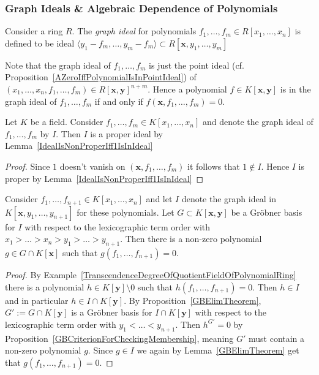 \subsubsection{Graph Ideals \& Algebraic Dependence of Polynomials} 
\begin{definition}
    Consider a ring $R$. The \textit{graph ideal} for polynomials $f_1,\dots,f_m\in R[x_1,\dots,x_n]$ is defined to be ideal $\langle y_1-f_m,\dots,y_m-f_m\rangle \subset R[\mathbf{x},y_1,\dots,y_m]$
\end{definition}
\begin{remark}
    Note that the graph ideal of $f_1,\dots,f_m$ is just the point ideal (cf. Proposition~\ref{AZeroIffPolynomialIsInPointIdeal}) of $(x_1,\dots,x_n,f_1,\dots,f_m) \in R[\mathbf{x},\mathbf{y}]^{n+m}$. Hence a polynomial $f\in K[\mathbf{x},\mathbf{y}]$ is in the graph ideal of $f_1,\dots,f_m$ if and only if $f(\mathbf{x},f_1,\dots,f_m)=0$.
\end{remark}
\begin{lemma}\label{GraphIdealIsProperIdeal}
   Let $K$ be a field. Consider $f_1,\dots,f_m\in K[x_1,\dots,x_n]$ and denote the graph ideal of $f_1,\dots,f_m$ by $I$. Then $I$ is a proper ideal by Lemma~\ref{IdealIsNonProperIff1IsInIdeal} 
\end{lemma}
\begin{proof}
    Since $1$ doesn't vanish on $(\mathbf{x},f_1,\dots,f_m)$ it follows that $1\notin I$. Hence $I$ is proper by Lemma~\ref{IdealIsNonProperIff1IsInIdeal}
\end{proof}
\begin{proposition}
    Consider $f_1,\dots,f_{n+1}\in K[x_1,\dots,x_n]$ and let $I$ denote the graph ideal in $K[\mathbf{x},y_1,\dots,y_{n+1}]$ for these polynomials. Let $G\subset K[\mathbf{x},\mathbf{y}]$ be a Gröbner basis for $I$ with respect to the lexicographic term order with $x_1>\dots>x_n>y_1>\dots>y_{n+1}$. Then there is a non-zero polynomial $g\in G\cap K[\mathbf{x}]$ such that $g(f_1,\dots,f_{n+1})=0$.   
\end{proposition}
\begin{proof}
    By Example~\ref{TranscendenceDegreeOfQuotientFieldOfPolynomialRing} there is a polynomial $h\in K[\mathbf{y}]\setminus 0$ such that $h(f_1,\dots,f_{n+1})=0$. Then $h\in I$ and in particular $h\in I\cap K[\mathbf{y}]$. By Proposition~\ref{GBElimTheorem}, $G':= G\cap K[\mathbf{y}]$ is a Gröbner basis for $I\cap K[\mathbf{y}]$ with respect to the lexicographic term order with $y_1<\dots< y_{n+1}$. Then $h^{G'} = 0$ by Proposition~\ref{GBCriterionForCheckingMembership}, meaning $G'$ must contain a non-zero polynomial $g$. Since $g\in I$ we again by Lemma~\ref{GBElimTheorem} get that $g(f_1,\dots,f_{n+1}) = 0$. 
\end{proof}
